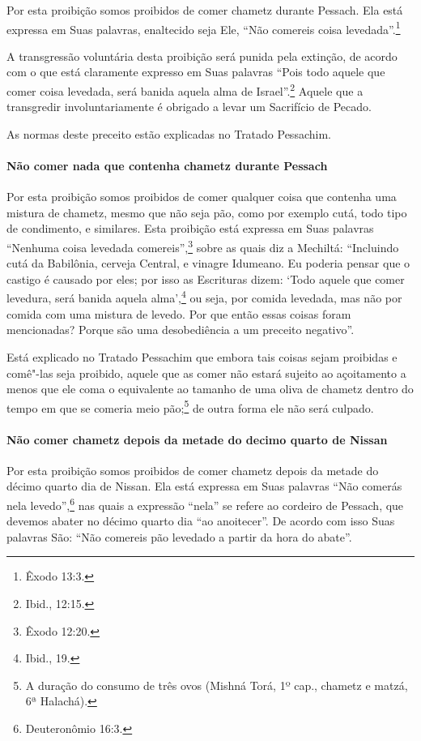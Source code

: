 \begin{multicols}{2}
Por esta proibição somos proibidos de comer chametz\starr{} durante
Pessach\starr. Ela está expressa em Suas palavras, enaltecido seja Ele,
``Não comereis coisa levedada''.\footnote{Êxodo 13:3.}

A transgressão voluntária desta proibição será punida pela extinção, de
acordo com o que está claramente expresso em Suas palavras ``Pois todo
aquele que comer coisa levedada, será banida aquela alma de Israel''.\footnote{Ibid., 12:15.} Aquele que a transgredir involuntariamente é obrigado a
levar um Sacrifício de Pecado.

As normas deste preceito estão explicadas no Tratado Pessachim\starr.

\paragraph{Não comer nada que contenha chametz\starr{} durante Pessach\starr{}}

Por esta proibição somos proibidos de comer qualquer coisa que contenha
uma mistura de chametz\starr, mesmo que não seja pão, como por exemplo
cutá\starr, todo tipo de condimento, e similares.
Esta proibição está expressa em Suas palavras ``Nenhuma coisa levedada
comereis'',\footnote{Êxodo 12:20.} sobre as quais diz a Mechiltá\starr: ``Incluindo
cutá\starr{} da Babilônia, cerveja Central, e vinagre Idumeano. Eu poderia
pensar que o castigo é causado por eles; por isso as Escrituras dizem:
`Todo aquele que comer levedura, será banida aquela alma',\footnote{Ibid., 19.}
ou seja, por comida levedada, mas não por comida com uma mistura de
levedo. Por que então essas coisas foram mencionadas? Porque são uma
desobediência a um preceito negativo''.

Está explicado no Tratado Pessachim\starr{} que embora tais coisas sejam
proibidas e comê"-las seja proibido, aquele que as comer não estará
sujeito ao açoitamento a menos que ele coma o equivalente ao tamanho de
uma oliva de chametz\starr{} dentro do tempo em que se comeria meio
pão;\footnote{A duração do consumo de três ovos (Mishná\starr{} Torá\starr, 1º cap., chametz\starr{} e
  matzá\starr, 6ª Halachá\starr).} de outra forma ele não será culpado.

\paragraph{Não comer chametz\starr{} depois da metade do decimo quarto de Nissan\starr}

Por esta proibição somos proibidos de comer chametz\starr{} depois da metade
do décimo quarto dia de Nissan\starr. Ela está expressa em Suas palavras ``Não
comerás nela levedo'',\footnote{Deuteronômio 16:3.} nas quais a expressão
``nela'' se refere ao cordeiro de Pessach\starr, que devemos abater no
décimo quarto dia ``ao anoitecer''. De acordo com isso Suas palavras
São: ``Não comereis pão levedado a partir da hora do abate''.


\end{multicols}
